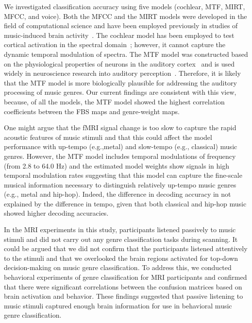 \documentclass[journal]{IEEEtran}
\begin{document}
We investigated classification accuracy using five models (cochlear, MTF, MIRT, MFCC, and voice).
Both the MFCC and the MIRT models were developed in the field of computational science and have been employed previously in studies of music-induced brain activity~\cite{alluri2012large,gucclu2016brains,toiviainen2014capturing}.
The cochlear model has been employed to test cortical activation in the spectral domain~\cite{de2017hierarchical};
however, it cannot capture the dynamic temporal modulation of spectra.
The MTF model was constructed based on the physiological properties of neurons in the auditory cortex~\cite{chi2005multiresolution} and is used widely in neuroscience research into auditory perception~\cite{norman2015distinct,patil2012music,santoro2014encoding,santoro2017reconstructing}.
Therefore, it is likely that the MTF model is more biologically plausible for addressing the auditory processing of music genres.
Our current findings are consistent with this view, because, of all the models, the MTF model showed the highest correlation coefficients between the FBS maps and genre-weight maps.

One might argue that the fMRI signal change is too slow to capture the rapid acoustic features of music stimuli and that this could affect the model performance with up-tempo (e.g.,metal) and slow-tempo (e.g., classical) music genres.
However, the MTF model includes temporal modulations of frequency (from 2.8 to 64.0 Hz) and the estimated model weights show signals in high temporal modulation rates suggesting that this model can capture the fine-scale musical information necessary to distinguish relatively up-tempo music genres (e.g., metal and hip-hop).
Indeed, the difference in decoding accuracy in not explained by the difference in tempo, given that both classical and hip-hop music showed higher decoding accuracies.

In the MRI experiments in this study, participants listened passively to music stimuli and did not carry out any genre classification tasks during scanning.
It could be argued that we did not confirm that the participants listened attentively to the stimuli and that we overlooked the brain regions activated for top-down decision-making on music genre classification.
To address this, we conducted behavioral experiments of genre classification for MRI participants and confirmed that there were significant correlations between the confusion matrices based on brain activation and behavior.
These findings suggested that passive listening to music stimuli captured enough brain information for use in behavioral music genre classification.
\end{document}
